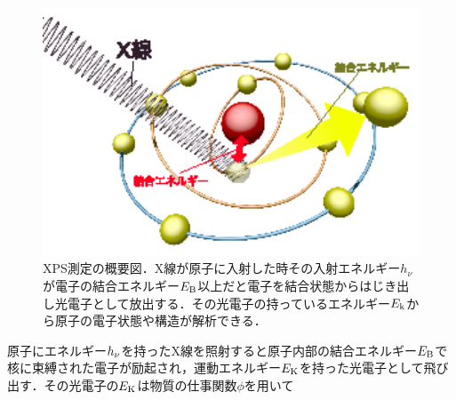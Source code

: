 {\begin{figure}[htbp]
\centerline{
\includegraphics[width=12cm]{images/XPS_concept.eps}
}
\caption{XPS測定の概要図．X線が原子に入射した時その入射エネルギー$h_{\nu}$が電子の結合エネルギー$E_{\rm B}$以上だと電子を結合状態からはじき出し光電子として放出する．その光電子の持っているエネルギー$E_{\rm k}$から原子の電子状態や構造が解析できる．
}
\label{fig:XPS_concept} 
\end{figure}

原子にエネルギー$h_{\rm\nu}$を持ったX線を照射すると原子内部の結合エネルギー$E_{\rm B}$で核に束縛された電子が励起され，運動エネルギー$E_{\rm K}$を持った光電子として飛び出す．その光電子の$E_{\rm K}$は物質の仕事関数$\phi$を用いて

}
